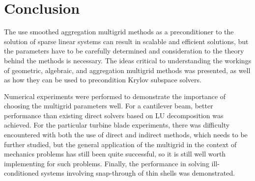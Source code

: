 \chapter{Conclusion}
\label{chapter:Conclusion}

The use smoothed aggregation multigrid methods as a preconditioner to the solution of sparse linear systems can result in scalable and efficient solutions, but the parameters have to be carefully determined and consideration to the theory behind the methods is necessary. The ideas critical to understanding the workings of geometric, algebraic, and aggregation multigrid methods was presented, as well as how they can be used to precondition Krylov subspace solvers.

Numerical experiments were performed to demonstrate the importance of choosing the multigrid parameters well. For a cantilever beam, better performance than existing direct solvers based on LU decomposition was achieved. For the particular turbine blade experiments, there was difficulty encountered with both the use of direct and indirect methods, which needs to be further studied, but the general application of the multigrid in the context of mechanics problems has still been quite successful, so it is still well worth implementing for such problems. Finally, the performance in solving ill-conditioned systems involving snap-through of thin shells was demonstrated.